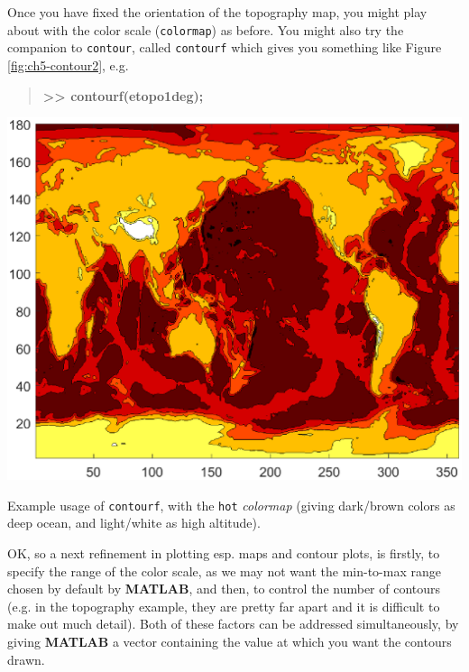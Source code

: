 \documentclass{tufte-book} %
\newenvironment{docspecbold}{\begin{quotation}\ttfamily\bfseries\parskip0pt\parindent0pt\ignorespaces}{\end{quotation}}
\begin{document}
Once you have fixed the orientation of the topography map, you might play about with the color scale (\texttt{colormap}) as before. You might also try the companion to \texttt{contour}, called \texttt{contourf} which gives you something like Figure \ref{fig:ch5-contour2}, e.g.
\begin{docspecbold}
>> contourf(etopo1deg);
\end{docspecbold}

\begin{marginfigure}[0.0in]
\includegraphics[width=\linewidth]{ch5-contour2.eps}
\caption{Example usage of \texttt{contourf}, with the \texttt{hot} \textit{colormap} (giving dark/brown colors as deep ocean, and light/white as high altitude).}
\label{fig:ch5-contour2}
\end{marginfigure}

OK, so a next refinement in plotting esp. maps and contour plots, is firstly, to specify the range of the color scale, as we may not want the min-to-max range chosen by default by \textbf{MATLAB}, and then, to control the number of contours (e.g. in the topography example, they are pretty far apart and it is difficult to make out much detail). Both of these factors can be addressed simultaneously, by giving \textbf{MATLAB} a vector containing the value at which you want the contours drawn.
\end{document}
